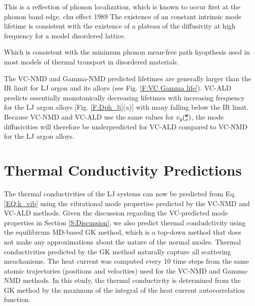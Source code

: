 \documentclass[aps,prb,onecolumn,preprint,footinbib,superscriptaddress,amsmath,amssymb,floatfix]{revtex4}
\newcommand{\kv}{\mspace{-4.0mu}\left(\mspace{-8.0mu}
\begin{smallmatrix}&\pmb{\kappa} \\&\nu\end{smallmatrix}
\mspace{-3.0mu}\right)}
\begin{document}
This is a reflection of phonon localization, which is known to 
occur first at the phonon band edge.
chu effect 1989\cite{chu_effect_1989} The existence of an 
constant intrinsic mode lifetime is consistent with the existence 
of a plateau of the diffusivity at high frequency for a model 
disordered lattice.\cite{sheng_heat_1991} 

Which is consistent with the minimum phonon mean-free path hyopthesis
 used in most models of thermal 
transport in disordered materials.
\cite{kittel_interpretation_1949,graebner_phonon_1986,
cahill_lattice_1988} 

The VC-NMD and Gamma-NMD predicted lifetimes are generally larger 
than the IR limit  
for LJ argon and its alloys (see Fig. \ref{F:VC Gamma life}).   
VC-ALD predicts essentially monotonically 
decreasing lifetimes with increasing frequency for the LJ argon 
alloys [Fig. \ref{F:Dph_lj}(a)] with many falling below the IR limit. 
Because VC-NMD and VC-ALD use the same values for $v_g\kv$, the 
mode diffusivities will therefore be underpredicted for 
VC-ALD compared to VC-NMD for the LJ argon alloys. 



\section{\label{S:Thermal Conductivity}Thermal Conductivity Predictions}

The thermal conductivities of the LJ systems can now be predicted from 
Eq. \eqref{EQ:k_vib} using the vibrational mode properties 
predicted by the VC-NMD and VC-ALD 
methods.  Given the discussion regarding the VC-predicted 
mode properties in Section \ref{S:Discussion}, 
we also predict thermal condudctivity using the equilibirum 
MD-based GK method, which 
is a top-down method that does not make any approximations about the 
nature of the normal modes. 
Thermal conductivities predicted by the GK method 
naturally capture all scattering meachanisms.
\cite{skye_thermal_2008,landry_complex_2008,landry_effect_2009} 
The heat current 
was computed every 10 time steps from the same atomic trajectories 
(positions and velocities) used for the VC-NMD and Gamma-NMD methods.  
In this study, the thermal conductivity is determined from the 
GK method by the maximum of the integral of the heat current 
autocorrelation function.
\end{document}
